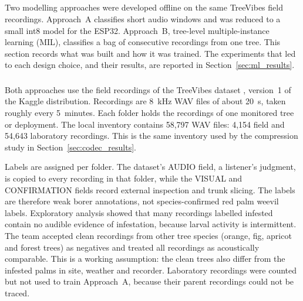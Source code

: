 \subsection{}
\label{sec:ml_development}
\begingroup
\color{black}
\setlength{\emergencystretch}{2em}\sloppy
Two modelling approaches were developed offline on the same TreeVibes field recordings. Approach~A classifies short audio windows and was reduced to a small int8 model for the ESP32. Approach~B, tree-level multiple-instance learning (MIL), classifies a bag of consecutive recordings from one tree. This section records what was built and how it was trained. The experiments that led to each design choice, and their results, are reported in Section~\ref{sec:ml_results}.

\subsubsection{}
\label{sec:ml_data}
Both approaches use the field recordings of the TreeVibes dataset \cite{rigakis2021}, version~1 of the Kaggle distribution. Recordings are 8~kHz WAV files of about 20~s, taken roughly every 5~minutes. Each folder holds the recordings of one monitored tree or deployment. The local inventory contains 58,797 WAV files: 4,154 field and 54,643 laboratory recordings. This is the same inventory used by the compression study in Section~\ref{sec:codec_results}.

Labels are assigned per folder. The dataset's AUDIO field, a listener's judgment, is copied to every recording in that folder, while the VISUAL and CONFIRMATION fields record external inspection and trunk slicing. The labels are therefore weak borer annotations, not species-confirmed red palm weevil labels. Exploratory analysis showed that many recordings labelled infested contain no audible evidence of infestation, because larval activity is intermittent. The team accepted clean recordings from other tree species (orange, fig, apricot and forest trees) as negatives and treated all recordings as acoustically comparable. This is a working assumption: the clean trees also differ from the infested palms in site, weather and recorder. Laboratory recordings were counted but not used to train Approach~A, because their parent recordings could not be traced.

